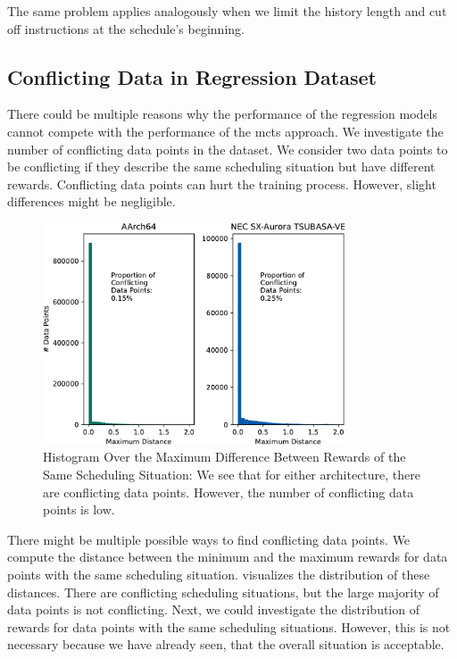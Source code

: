 The same problem applies analogously when we limit the history length and cut off instructions at the schedule's beginning.

\subsection{Conflicting Data in Regression Dataset}
There could be multiple reasons why the performance of the regression models cannot compete with the performance of the \ac{mcts} approach.
We investigate the number of conflicting data points in the dataset.
We consider two data points to be conflicting if they describe the same scheduling situation but have different rewards.
Conflicting data points can hurt the training process.
However, slight differences might be negligible.

\begin{figure}
    \centering
    \includegraphics[width=0.8\textwidth]{img/hist-regr-conflicts-crop.pdf}
    \caption[Histogram Over the Maximum Difference Between Rewards of the Same Scheduling Situation]{Histogram Over the Maximum Difference Between Rewards of the Same Scheduling Situation:
    We see that for either architecture, there are conflicting data points.
    However, the number of conflicting data points is low.}
    \label{fig:eval:hist-conflicting-data-points}
\end{figure}
There might be multiple possible ways to find conflicting data points.
We compute the distance between the minimum and the maximum rewards for data points with the same scheduling situation.
 visualizes the distribution of these distances.
There are conflicting scheduling situations, but the large majority of data points is not conflicting.
Next, we could investigate the distribution of rewards for data points with the same scheduling situations.
However, this is not necessary because we have already seen, that the overall situation is acceptable.

